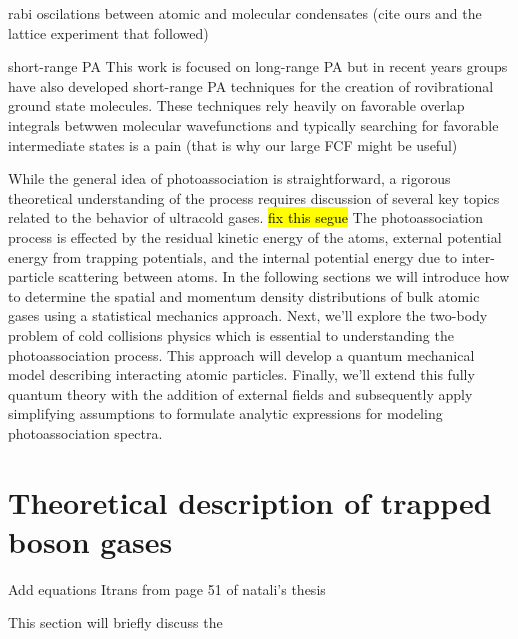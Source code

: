 rabi oscilations between atomic and molecular condensates (cite ours and the lattice experiment that followed)

short-range PA
This work is focused on long-range PA but in recent years groups have also developed short-range PA techniques for the creation of rovibrational ground state molecules. These techniques rely heavily on favorable overlap integrals betwwen molecular wavefunctions and typically searching for favorable intermediate states is a pain (that is why our large FCF might be useful)

While the general idea of photoassociation is straightforward, a rigorous theoretical understanding of the process requires discussion of several key topics related to the behavior of ultracold gases. \hl{fix this segue}
The photoassociation process is effected by the residual kinetic energy of the atoms, external potential energy from trapping potentials, and the internal potential energy due to inter-particle scattering between atoms.
In the following sections we will introduce how to determine the spatial and momentum density distributions of bulk atomic gases using a statistical mechanics approach. Next, we'll explore the two-body problem of cold collisions physics which is essential to understanding the photoassociation process. This approach will develop a quantum mechanical model describing interacting atomic particles. Finally, we'll extend this fully quantum theory with the addition of external fields and subsequently apply simplifying assumptions to formulate analytic expressions for modeling photoassociation spectra.



\section{Theoretical description of trapped boson gases} \label{sec:trapped_gases}

Add equations Itrans from page 51 of natali's thesis

This section will briefly discuss the 

